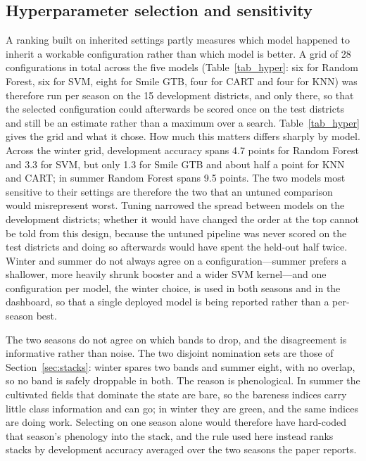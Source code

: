 \documentclass[conference]{IEEEtran}
\begin{document}
\subsection{Hyperparameter selection and sensitivity}
\label{sec:tuning}
A ranking built on inherited settings partly measures which model happened to inherit a workable configuration rather than which model is better. A grid of 28 configurations in total across the five models (Table~\ref{tab_hyper}: six for Random Forest, six for SVM, eight for Smile GTB, four for CART and four for KNN) was therefore run per season on the 15 development districts, and only there, so that the selected configuration could afterwards be scored once on the test districts and still be an estimate rather than a maximum over a search. Table~\ref{tab_hyper} gives the grid and what it chose. How much this matters differs sharply by model. Across the winter grid, development accuracy spans 4.7 points for Random Forest and 3.3 for SVM, but only 1.3 for Smile GTB and about half a point for KNN and CART; in summer Random Forest spans 9.5 points. The two models most sensitive to their settings are therefore the two that an untuned comparison would misrepresent worst. Tuning narrowed the spread between models on the development districts; whether it would have changed the order at the top cannot be told from this design, because the untuned pipeline was never scored on the test districts and doing so afterwards would have spent the held-out half twice. Winter and summer do not always agree on a configuration---summer prefers a shallower, more heavily shrunk booster and a wider SVM kernel---and one configuration per model, the winter choice, is used in both seasons and in the dashboard, so that a single deployed model is being reported rather than a per-season best.

The two seasons do not agree on which bands to drop, and the disagreement is informative rather than noise. The two disjoint nomination sets are those of Section~\ref{sec:stacks}: winter spares two bands and summer eight, with no overlap, so no band is safely droppable in both. The reason is phenological. In summer the cultivated fields that dominate the state are bare, so the bareness indices carry little class information and can go; in winter they are green, and the same indices are doing work. Selecting on one season alone would therefore have hard-coded that season's phenology into the stack, and the rule used here instead ranks stacks by development accuracy averaged over the two seasons the paper reports.
\end{document}
